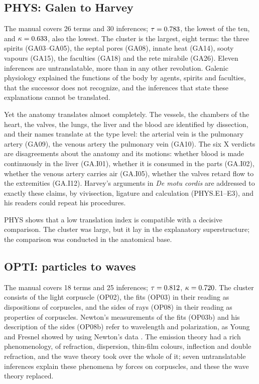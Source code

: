 \documentclass{situationist-preprint}
\begin{document}
\subsection{PHYS: Galen to Harvey}

The manual covers 26 terms and 30 inferences; $\tau = 0.783$, the lowest of the ten, and $\kappa = 0.633$, also the lowest. The cluster is the largest, eight terms: the three spirits (GA03--GA05), the septal pores (GA08), innate heat (GA14), sooty vapours (GA15), the faculties (GA18) and the rete mirabile (GA26). Eleven inferences are untranslatable, more than in any other revolution. Galenic physiology explained the functions of the body by agents, spirits and faculties, that the successor does not recognize, and the inferences that state these explanations cannot be translated.

Yet the anatomy translates almost completely. The vessels, the chambers of the heart, the valves, the lungs, the liver and the blood are identified by dissection, and their names translate at the type level: the arterial vein is the pulmonary artery (GA09), the venous artery the pulmonary vein (GA10). The six X verdicts are disagreements about the anatomy and its motions: whether blood is made continuously in the liver (GA.I01), whether it is consumed in the parts (GA.I02), whether the venous artery carries air (GA.I05), whether the valves retard flow to the extremities (GA.I12). Harvey's arguments in \emph{De motu cordis} \citep{French1994} are addressed to exactly these claims, by vivisection, ligature and calculation (PHYS.E1--E3), and his readers could repeat his procedures.

PHYS shows that a low translation index is compatible with a decisive comparison. The cluster was large, but it lay in the explanatory superstructure; the comparison was conducted in the anatomical base.

\subsection{OPTI: particles to waves}

The manual covers 18 terms and 25 inferences; $\tau = 0.812$, $\kappa = 0.720$. The cluster consists of the light corpuscle (OP02), the fits (OP03) in their reading as dispositions of corpuscles, and the sides of rays (OP08) in their reading as properties of corpuscles. Newton's measurements of the fits (OP03b) and his description of the sides (OP08b) refer to wavelength and polarization, as Young and Fresnel showed by using Newton's data \citep{Buchwald1989}. The emission theory had a rich phenomenology, of refraction, dispersion, thin-film colours, inflection and double refraction, and the wave theory took over the whole of it; seven untranslatable inferences explain these phenomena by forces on corpuscles, and these the wave theory replaced.
\end{document}
